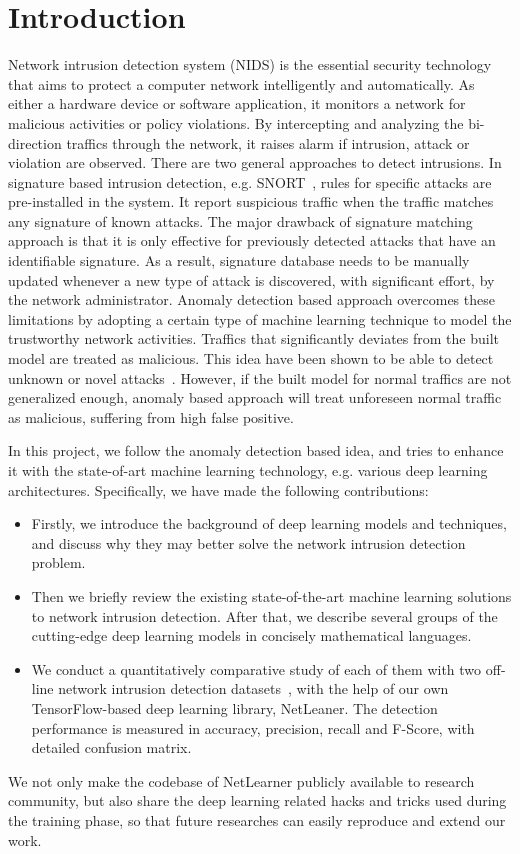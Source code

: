 \section{Introduction}

Network intrusion detection system (NIDS) is the essential security technology that
aims to protect a computer network intelligently and automatically.
As either a hardware device or software application,
it monitors a network for malicious activities or policy violations.
By intercepting and analyzing the bi-direction traffics through the network,
it raises alarm if intrusion, attack or violation are observed.
There are two general approaches to detect intrusions.
In signature based intrusion detection, e.g. SNORT~\cite{Snort},
rules for specific attacks are pre-installed in the system.
It report suspicious traffic when the traffic matches any signature of known attacks.
The major drawback of signature matching approach is that
it is only effective for previously detected attacks that have an identifiable signature.
As a result, signature database needs to be manually updated whenever a new type of attack
is discovered, with significant effort, by the network administrator.
Anomaly detection based approach overcomes these limitations by adopting a certain
type of machine learning technique to model the trustworthy network activities.
Traffics that significantly deviates from the built model are treated as malicious.
This idea have been shown to be able to detect unknown or novel attacks~\cite{NSL-KDD, STL-NIDS}.
However, if the built model for normal traffics are not generalized enough,
anomaly based approach will treat unforeseen normal traffic as malicious,
suffering from high false positive.

In this project, we follow the anomaly detection based idea, and tries to enhance it with the
state-of-art machine learning technology, e.g. various deep learning architectures.
Specifically, we have made the following contributions:
\begin{itemize}
    \item Firstly, we introduce the background of deep learning models and techniques,
        and discuss why they may better solve the network intrusion detection problem.
    \item Then we briefly review the existing state-of-the-art machine learning solutions to network intrusion detection.
        After that, we describe several groups of the cutting-edge deep learning models
        in concisely mathematical languages.
    \item We conduct a quantitatively comparative study of each of them with
        two off-line network intrusion detection datasets~\cite{NSL-KDD, UNSW},
        with the help of our own TensorFlow-based deep learning library, NetLeaner.
        The detection performance is measured in accuracy, precision, recall and F-Score,
        with detailed confusion matrix.
\end{itemize}

We not only make the codebase of NetLearner publicly available to research community,
but also share the deep learning related hacks and tricks used during the training phase,
so that future researches can easily reproduce and extend our work.
